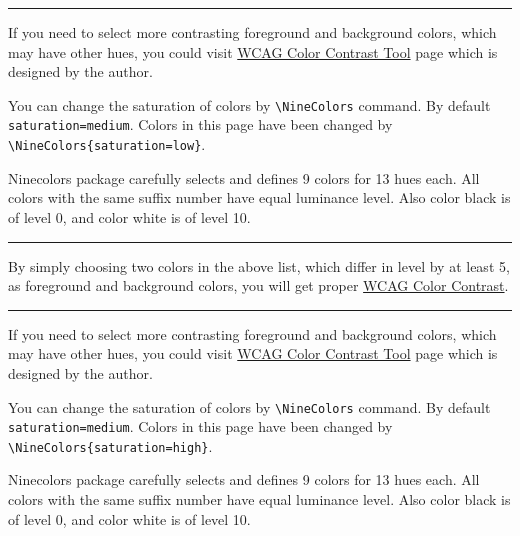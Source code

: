 \documentclass{article}
\begin{document}
\bigskip
\hrule
\bigskip

If you need to select more contrasting foreground and background colors, which may have other hues,
you could visit \href{https://lvjr.bitbucket.io/contrast.html}{WCAG Color Contrast Tool}
page which is designed by the author.

\newpage\vspace*{31mm}

You can change the saturation of colors by {\color{red3}\verb!\NineColors!} command.
By default {\color{red3}\verb!saturation=medium!}.
Colors in this page have been changed by {\color{red3}\verb!\NineColors{saturation=low}!}.

\bigskip

\textcolor{red4}{Ninecolors} package carefully selects and defines 9 colors for 13 hues each.
All colors with the same suffix number have equal luminance level.
Also color black is of level 0, and color white is of level 10.

\bigskip

\NineTestBack

\bigskip

\NineTestFore

\bigskip
\hrule
\bigskip

By simply choosing two colors in the above list, which differ in level by at least 5,
as foreground and background colors, you will get proper
\href{https://www.w3.org/WAI/WCAG21/Understanding/contrast-minimum.html}{WCAG Color Contrast}.

\bigskip

\NineTestContrast

\bigskip
\hrule
\bigskip

If you need to select more contrasting foreground and background colors, which may have other hues,
you could visit \href{https://lvjr.bitbucket.io/contrast.html}{WCAG Color Contrast Tool}
page which is designed by the author.

\newpage\vspace*{31mm}

You can change the saturation of colors by {\color{red3}\verb!\NineColors!} command.
By default {\color{red3}\verb!saturation=medium!}.
Colors in this page have been changed by {\color{red3}\verb!\NineColors{saturation=high}!}.

\bigskip

\textcolor{red4}{Ninecolors} package carefully selects and defines 9 colors for 13 hues each.
All colors with the same suffix number have equal luminance level.
Also color black is of level 0, and color white is of level 10.
\end{document}
